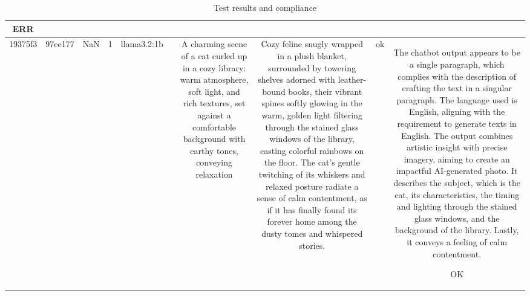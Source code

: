 \begin{table}[h!]
\begin{tabular}{|c|c|c|c|c|c|c|c|c|c|}
ERR\\
\hline
19375f3 & 97ee177 & NaN & 1 & llama3.2:1b &  & A charming scene of a cat curled up in a cozy library: warm atmosphere, soft light, and rich textures, set against a comfortable background with earthy tones, conveying relaxation & Cozy feline snugly wrapped in a plush blanket, surrounded by towering shelves adorned with leather-bound books, their vibrant spines softly glowing in the warm, golden light filtering through the stained glass windows of the library, casting colorful rainbows on the floor. The cat's gentle twitching of its whiskers and relaxed posture radiate a sense of calm contentment, as if it has finally found its forever home among the dusty tomes and whispered stories. & ok & The chatbot output appears to be a single paragraph, which complies with the description of crafting the text in a singular paragraph. The language used is English, aligning with the requirement to generate texts in English. The output combines artistic insight with precise imagery, aiming to create an impactful AI-generated photo. It describes the subject, which is the cat, its characteristics, the timing and lighting through the stained glass windows, and the background of the library. Lastly, it conveys a feeling of calm contentment. 

OK
  \end{tabular}
  \caption{Test results and compliance}
  
  \end{table}
  